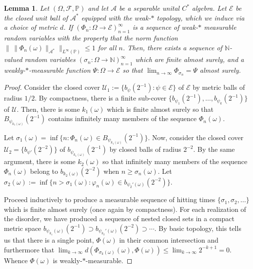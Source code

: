 \documentclass{article}
\newcommand{\A}{\mathcal{A}}
\newcommand{\N}{\mathbb N}
\renewcommand{\P}{\mathbb{P}}
\newcommand{\<}{\langle}
\renewcommand{\>}{\rangle}
\newtheorem{lem}[thm]{Lemma}
\theoremstyle{definition}
\numberwithin{equation}{section}
\begin{document}
\begin{lem}\label{lem:hitting_time_compact}
    Let $(\Omega, \mathcal{F}, \P)$ and let $\A$ be a separable unital $C^*$ algebra. Let $\mathscr{E}$ be the closed unit ball of $\A^*$ equipped with the weak-$\ast$ topology, which we induce via a choice of metric $d$. If $(\Phi_n:\Omega \to \mathscr{E})_{n=1}^\infty$ is a sequence of weak-$\ast$ measurable random variables with the property that the norm function $\|\, \|\Phi_n(\omega)\|_{\A^*}\|_{L^\infty(\P)}\le 1$ for all $n$. Then, there exists a sequence of $\N$-valued random variables $(\sigma_n: \Omega \to \mathbb{N})_{n=1}^\infty$ which are finite almost surely, and a weakly-$\ast$-measurable function $\Psi:\Omega \to \mathscr{E}$ so that $\lim_{n\to \infty} \Phi_{\sigma_n} = \Psi$ almost surely.
\end{lem}
\begin{proof}
    Consider the closed cover $\mathcal{U}_1:=\{b_\psi(2^{-1})\colon \psi \in \mathscr{E}\}$ of $\mathscr{E}$ by metric balls of radius $1/2$. By compactness, there is a finite sub-cover $\{b_{\psi_1}(2^{-1}), \dots, b_{\psi_k}(2^{-1})\}$ of $\mathcal{U}$. Then, there is some $k_1(\omega)$ which is finite almost surely so that $B_{\psi_{k_1(\omega)}}(2^{-1})$ contains infinitely many members of the sequence $\Phi_n(\omega)$. 
    
    Let $\sigma_{1}(\omega) = \inf\{n\colon \Phi_n(\omega) \in B_{\psi_{k_1(\omega)}}(2^{-1})\}$. Now, consider the closed cover $\mathcal{U}_2 = \{b_{\psi'}(2^{-2})\}$ of $b_{\psi_{k_1(\omega)}}(2^{-1})$ by closed balls of radius $2^{-2}$. By the same argument, there is some $k_2(\omega)$ so that infinitely many members of the sequence $\Phi_n(\omega)$ belong to $b_{k_2(\omega)}(2^{-2})$ when $n\ge \sigma_n(\omega)$. Let $\sigma_2(\omega) := \inf\{ n> \sigma_1(\omega)  \colon \varphi_n(\omega) \in b_{\psi_2'(\omega)}(2^{-2}) \}$. 
    
    Proceed inductively to produce a measurable sequence of hitting times $\{\sigma_1, \sigma_2, \dots\}$ which is finite almost surely (once again by compactness). For each realization of the disorder, we have produced a sequence of nested closed sets in a compact metric space $b_{\psi_{k_1}(\omega)}(2^{-1}) \supset b_{\psi_{k_2}'(\omega)}(2^{-2}) \supset \cdots$. By basic topology, this tells us that there is a single point, $\Phi(\omega)$ in their common intersection and furthermore that $\lim_{k\to \infty} d(\Phi_{\sigma_k(\omega)}(\omega), \Phi(\omega))\le\lim_{k\to \infty} 2^{-k+1} = 0$. Whence $\Phi(\omega)$ is weakly-$\ast$-measurable. 
\end{proof}
\end{document}
